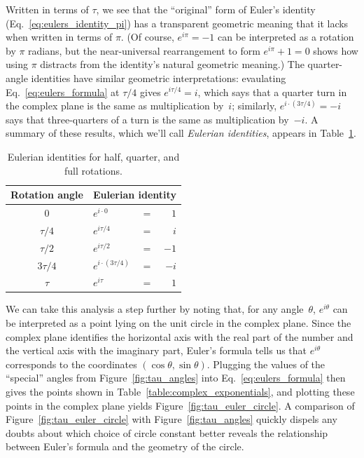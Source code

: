 Written in terms of $\tau$, we see that the ``original'' form of Euler's identity (Eq.~\eqref{eq:eulers_identity_pi}) has a transparent geometric meaning that it lacks when written in terms of $\pi$. (Of course, $e^{i\pi} = -1$ can be interpreted as a rotation by $\pi$ radians, but the near-universal rearrangement to form $e^{i\pi} + 1 = 0$ shows how using $\pi$ distracts from the identity's natural geometric meaning.) The quarter-angle identities have similar geometric interpretations: evaulating Eq.~\eqref{eq:eulers_formula} at $\tau/4$ gives $e^{i\tau/4} = i$, which says that a quarter turn in the complex plane is the same as multiplication by~$i$; similarly, $e^{i\cdot(3\tau/4)} = -i$ says that three-quarters of a turn is the same as multiplication by~$-i$. A summary of these results, which we'll call \emph{Eulerian identities}, appears in Table~\ref{table:eulerian_identities}.

\begin{table}
\begin{center}
\begin{tabular}{cllr}
Rotation angle & \multicolumn{3}{c}{Eulerian identity} \\ \hline
$0$ & $e^{i\cdot0}$ & $ = $ & $1$ \smallskip \\
$\tau/4$ & $e^{i\tau/4}$ & $ = $ & $i$ \smallskip \\
$\tau/2$ & $e^{i\tau/2}$ & $ = $ & $-1$ \smallskip \\
$3\tau/4$ & $e^{i\cdot(3\tau/4)}$ & $ = $ & $-i$ \smallskip \\
$\tau$ & $e^{i\tau}$ & $ = $ & $1$
\end{tabular}
\end{center}
\caption{Eulerian identities for half, quarter, and full rotations.\label{table:eulerian_identities}}
\end{table}

We can take this analysis a step further by noting that, for any angle~$\theta$, $e^{i\theta}$ can be interpreted as a point lying on the unit circle in the complex plane. Since the complex plane identifies the horizontal axis with the real part of the number and the vertical axis with the imaginary part, Euler's formula tells us that $e^{i\theta}$ corresponds to the coordinates $(\cos\theta, \sin\theta)$. Plugging the values of the ``special'' angles from Figure~\ref{fig:tau_angles} into Eq.~\eqref{eq:eulers_formula} then gives the points shown in Table~\ref{table:complex_exponentials}, and plotting these points in the complex plane yields Figure~\ref{fig:tau_euler_circle}. A comparison of Figure~\ref{fig:tau_euler_circle} with Figure~\ref{fig:tau_angles} quickly dispels any doubts about which choice of circle constant better reveals the relationship between Euler's formula and the geometry of the circle.

